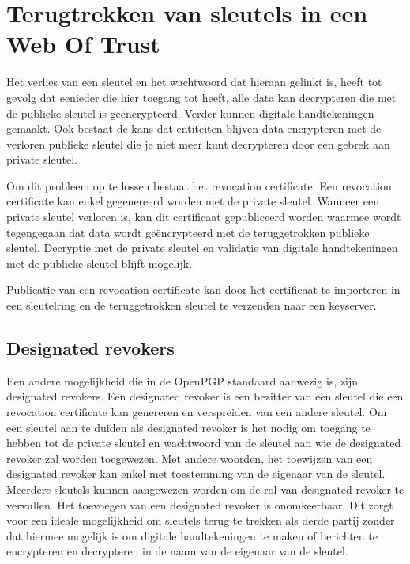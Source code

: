 \section{Terugtrekken van sleutels in een Web Of Trust}
\label{sec:terugtrekken-van-sleutels-in-een-wot}

Het verlies van een sleutel en het wachtwoord dat hieraan gelinkt is, heeft tot
gevolg dat eenieder die hier toegang tot heeft, alle data kan decrypteren die
met de publieke sleutel is geëncrypteerd. Verder kunnen digitale handtekeningen
gemaakt. Ook bestaat de kans dat entiteiten blijven data encrypteren met de
verloren publieke sleutel die je niet meer kunt decrypteren door een gebrek aan
private sleutel.

Om dit probleem op te lossen bestaat het revocation certificate. Een revocation
certificate kan enkel gegenereerd worden met de private sleutel. Wanneer een
private sleutel verloren is, kan dit certificaat gepubliceerd worden waarmee
wordt tegengegaan dat data wordt geëncrypteerd met de teruggetrokken publieke
sleutel. Decryptie met de private sleutel en validatie van digitale
handtekeningen met de publieke sleutel blijft mogelijk.
\autocite{GNUManualGettingStarted}

Publicatie van een revocation certificate kan door het certificaat te importeren
in een sleutelring en de teruggetrokken sleutel te verzenden naar een keyserver.

\subsection{Designated revokers}
\label{subsec:designated-revokers}

Een andere mogelijkheid die in de OpenPGP standaard aanwezig is, zijn designated
revokers. Een designated revoker is een bezitter van een sleutel die een
revocation certificate kan genereren en verspreiden van een andere sleutel.
\autocite{rfc4880} Om een sleutel aan te duiden als designated revoker is het
nodig om toegang te hebben tot de private sleutel en wachtwoord van de sleutel
aan wie de designated revoker zal worden toegewezen. Met andere woorden, het
toewijzen van een designated revoker kan enkel met toestemming van de eigenaar
van de sleutel. Meerdere sleutels kunnen aangewezen worden om de rol van
designated revoker te vervullen. Het toevoegen van een designated revoker is
onomkeerbaar. Dit zorgt voor een ideale mogelijkheid om sleutels terug te
trekken als derde partij zonder dat hiermee mogelijk is om digitale
handtekeningen te maken of berichten te encrypteren en decrypteren in de naam
van de eigenaar van de sleutel.

